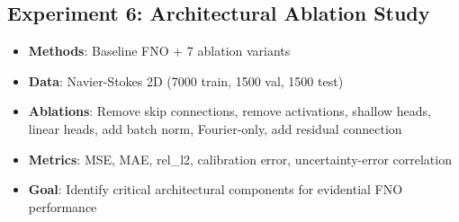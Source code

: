 \subsection{Experiment 6: Architectural Ablation Study}

\begin{itemize}
\item \textbf{Methods}: Baseline FNO + 7 ablation variants
\item \textbf{Data}: Navier-Stokes 2D (7000 train, 1500 val, 1500 test)
\item \textbf{Ablations}: Remove skip connections, remove activations, shallow heads, linear heads, add batch norm, Fourier-only, add residual connection
\item \textbf{Metrics}: MSE, MAE, rel\_l2, calibration error, uncertainty-error correlation
\item \textbf{Goal}: Identify critical architectural components for evidential FNO performance
\end{itemize}


